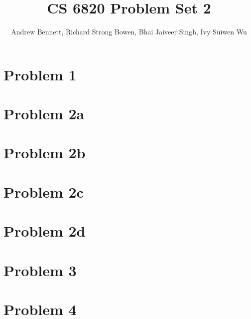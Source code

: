 \documentclass{article}
\author{Andrew Bennett, Richard Strong Bowen, Bhai Jaiveer Singh, Ivy Suiwen Wu}
\title{CS 6820 Problem Set 2}
\begin{document}
\maketitle

\section{Problem 1}

\section{Problem 2a}

\section{Problem 2b}

\section{Problem 2c}

\section{Problem 2d}

\section{Problem 3}

\section{Problem 4}
\end{document}
